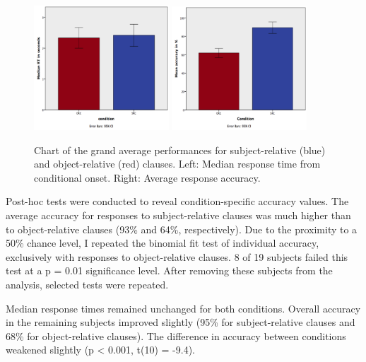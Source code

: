 \begin{figure}[h]
\begin{center}
\vspace{7mm}
\includegraphics[width=0.45\textwidth]{pics/2_RTgraph}
\includegraphics[width=0.45\textwidth]{pics/2_RAgraph}
\caption{\label{2.RTgraph} Chart of the grand average performances for subject-relative (blue) and object-relative (red) clauses. Left: Median response time from conditional onset. Right: Average response accuracy.}
\end{center}
\end{figure}

Post-hoc tests were conducted to reveal condition-specific accuracy values.
The average accuracy for responses to subject-relative clauses was much higher than to object-relative clauses (93\% and 64\%, respectively).
Due to the proximity to a 50\% chance level, I repeated the binomial fit test of individual accuracy, exclusively with responses to object-relative clauses.
8 of 19 subjects failed this test at a p = 0.01 significance level.
After removing these subjects from the analysis, selected tests were repeated.

Median response times remained unchanged for both conditions.
Overall accuracy in the remaining subjects improved slightly (95\% for subject-relative clauses and 68\% for object-relative clauses).
The difference in accuracy between conditions weakened slightly (p < 0.001, t(10) = -9.4).


